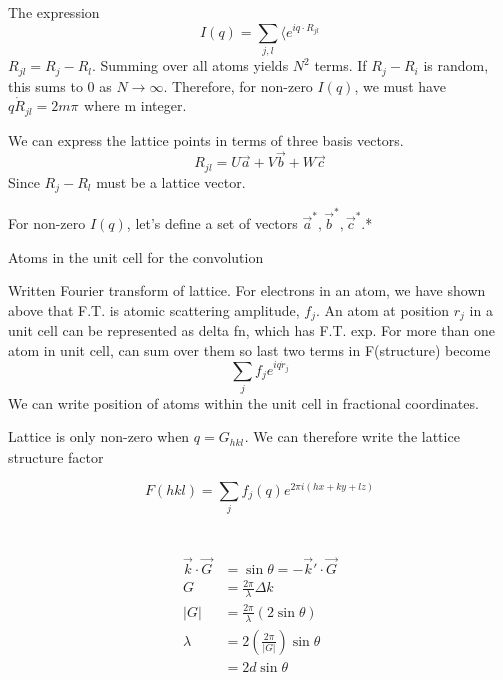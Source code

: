 \documentclass[a4paper, 11pt, normalem]{report}
\begin{document}
The expression
\begin{equation}
    I(q) = \sum_{j,l} \langle e^{iq \cdot R_{jl}}
\end{equation}
$R_{jl} = R_j - R_l$.
Summing over all atoms yields $N^2$ terms.
If $R_j - R_i$ is random, this sums to 0 as $N \to \infty$.
Therefore, for non-zero $I(q)$, we must have $q\dot R_{jl} = 2m\pi_{}$ where m integer.

We can express the lattice points in terms of three basis vectors.
\begin{equation}
    R_{jl} = U\vec{a} + V\vec{b} + W\vec{c}
\end{equation}
Since $R_j - R_l$ must be a lattice vector.

For non-zero $I(q)$, let's define a set of vectors $\vec{a}^{*}, \vec{b}^{*}, \vec{c}^{*}$.*

Atoms in the unit cell for the convolution

Written Fourier transform of lattice.
For electrons in an atom, we have shown above that F.T. is atomic scattering amplitude, $f_j$.
An atom at position $r_j$ in a unit cell can be represented as delta fn, which has F.T. exp.
For more than one atom in unit cell, can sum over them so last two terms in F(structure) become
\begin{equation}
    \sum_j f_j e^{iq\dot r_j}
\end{equation}
We can write position of atoms within the unit cell in fractional coordinates.

Lattice is only non-zero when $q = G_{hkl_{}}$.
We can therefore write the lattice structure factor

\begin{equation}
    F(hkl) = \sum_j f_j(q)e^{2\pi i(hx + ky + lz)}
\end{equation}

\chapter{}

\begin{align}
    \vec{k}\cdot\vec{G} &= \sin\theta = -\vec{k}'\cdot\vec{G} \\
    G &= \frac{2\pi}{\lambda}\Delta k \\
    |G| &= \frac{2\pi}{\lambda}(2\sin\theta) \\
    \lambda &= 2\left(\frac{2\pi}{|G|}\right)\sin\theta \\
    &= 2d\sin\theta
\end{align}
\end{document}
